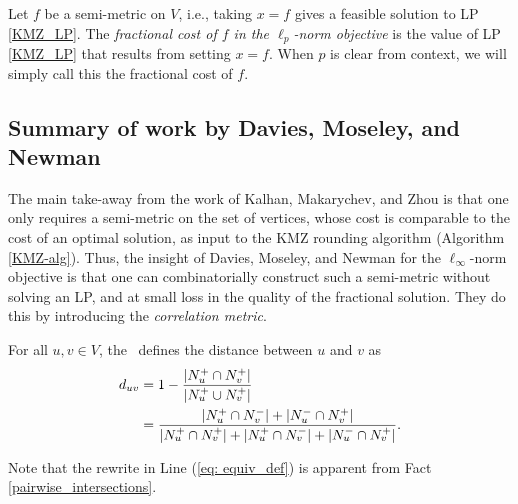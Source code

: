 \begin{definition} \label{def: frac_cost}
    Let $f$ be a semi-metric on $V$, i.e., taking $x=f$ gives a feasible solution to LP \ref{KMZ_LP}. The \emph{fractional cost of $f$ in the $\ell_p$-norm objective} is the value of LP \ref{KMZ_LP} that results from setting $x=f$. When $p$ is clear from context, we will simply call this the fractional cost of $f$. 
\end{definition}



\subsection{Summary of work by Davies, Moseley, and Newman}\label{sec: DMN-summary}


The main take-away from the work of Kalhan, Makarychev, and Zhou \citeyearpar{KMZ19} is that one only requires a semi-metric on the set of vertices,
whose cost is comparable to the cost of an optimal solution,
as input to the KMZ rounding algorithm (Algorithm \ref{KMZ-alg}). 
Thus, the insight of Davies, Moseley, and Newman \citeyearpar{DMN23} for the $\ell_{\infty}$-norm objective is that one can combinatorially construct such a semi-metric without solving an LP, and at small loss in the quality of the fractional solution.
They do this by introducing the \emph{correlation metric}.


\begin{definition} \label{def: orig_corr_metric}
For all $u,v \in V$, the \textit{\dn}~defines the 
distance between $u$ and $v$ as
\begin{align}
 \label{eq: equiv_def}
d_{uv} &= 1-\frac{|N_u^+ \cap N_v^+|}{|N_u^+ \cup N_v^+|} \notag \\
&=  \frac{|N_u^+ \cap N_v^-| +|N_u^- \cap N_v^+| }{|N_u^+ \cap N_v^+| + |N_u^+ \cap N_v^-| + |N_u^- \cap N_v^+|}.
\end{align}
\end{definition}

Note that the rewrite in Line (\ref{eq: equiv_def}) is apparent from Fact \ref{pairwise_intersections}.


